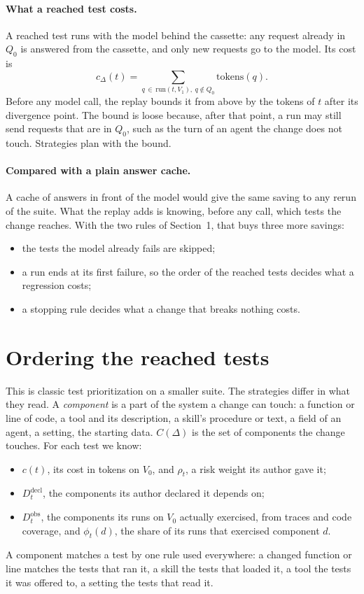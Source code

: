 \documentclass[11pt,a4paper]{article}
\newcommand{\Ddecl}{D^{\mathrm{decl}}_t}
\newcommand{\Dobs}{D^{\mathrm{obs}}_t}
\begin{document}
\paragraph{What a reached test costs.} A reached test runs with the model behind the cassette: any request already
in $Q_0$ is answered from the cassette, and only new requests go to the model. Its cost is
\[
  c_\Delta(t) = \sum_{q \,\in\, \mathrm{run}(t, V_1),\ q \notin Q_0} \mathrm{tokens}(q).
\]
Before any model call, the replay bounds it from above by the tokens of $t$ after its divergence point. The bound is
loose because, after that point, a run may still send requests that are in $Q_0$, such as the turn of an agent the
change does not touch. Strategies plan with the bound.

\paragraph{Compared with a plain answer cache.} A cache of answers in front of the model would give the same saving
to any rerun of the suite. What the replay adds is knowing, before any call, which tests the change reaches. With
the two rules of Section~1, that buys three more savings:
\begin{itemize}
  \item the tests the model already fails are skipped;
  \item a run ends at its first failure, so the order of the reached tests decides what a regression costs;
  \item a stopping rule decides what a change that breaks nothing costs.
\end{itemize}

\section{Ordering the reached tests}
\label{sec:order}

This is classic test prioritization on a smaller suite. The strategies differ in what they read. A
\emph{component} is a part of the system a change can touch: a function or line of code, a tool and its
description, a skill's procedure or text, a field of an agent, a setting, the starting data. $C(\Delta)$ is the set
of components the change touches. For each test we know:
\begin{itemize}
  \item $c(t)$, its cost in tokens on $V_0$, and $\rho_t$, a risk weight its author gave it;
  \item $\Ddecl$, the components its author declared it depends on;
  \item $\Dobs$, the components its runs on $V_0$ actually exercised, from traces and code coverage, and
        $\phi_t(d)$, the share of its runs that exercised component $d$.
\end{itemize}
A component matches a test by one rule used everywhere: a changed function or line matches the tests that ran it, a
skill the tests that loaded it, a tool the tests it was offered to, a setting the tests that read it.
\end{document}
